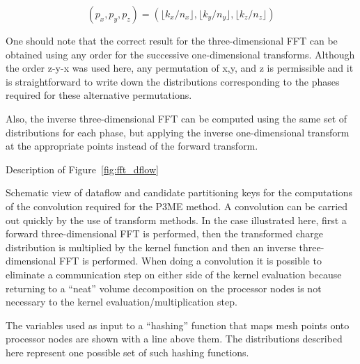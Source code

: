 \documentclass[pdftex,finalversion,simpleeqnnos,titlepage,12pt]{article}
\newcommand{\nodecoord}[1]{\ensuremath{p_{#1}}}
\newcommand{\meshpernode}[1]{\ensuremath{n_{#1}}}
\begin{document}
\begin{displaymath}
(\nodecoord{x}, \nodecoord{y}, \nodecoord{z}) = (\lfloor
  k_x/\meshpernode{x} \rfloor, \lfloor k_y/\meshpernode{y} \rfloor, \lfloor
  k_z/\meshpernode{z} \rfloor)
\end{displaymath}

One should note that the correct result for the three-dimensional FFT
can be obtained using any order for the successive one-dimensional
transforms.  Although the order z-y-x was used here, any permutation
of x,y, and z is permissible and it is straightforward to write down
the distributions corresponding to the phases required for these
alternative permutations.

Also, the inverse three-dimensional FFT can be computed using the same
set of distributions for each phase, but applying the inverse
one-dimensional transform at the appropriate points instead of the
forward transform.

\newpage  %

Description of Figure~\ref{fig:fft_dflow}

Schematic view of dataflow and candidate partitioning keys for the
computations of the convolution required for the P3ME method.  A
convolution can be carried out quickly by the use of transform
methods.  In the case illustrated here, first a forward
three-dimensional FFT is performed, then the transformed charge
distribution is multiplied by the kernel function and then an inverse
three-dimensional FFT is performed.  When doing a convolution it is
possible to eliminate a communication step on either side of the
kernel evaluation because returning to a ``neat'' volume decomposition
on the processor nodes is not necessary to the kernel
evaluation/multiplication step.

The variables used as input to a ``hashing'' function that maps mesh
points onto processor nodes are shown with a line above them.  The
distributions described here represent one possible set of such
hashing functions.






\end{document}
